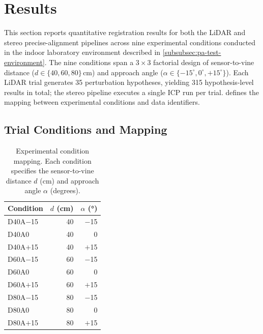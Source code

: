 \section{Results}
\label{sec:precise-alignment-results}

This section reports quantitative registration results for both the LiDAR and stereo precise-alignment pipelines across nine experimental conditions conducted in the indoor laboratory environment described in \cref{subsubsec:pa-test-environment}. The nine conditions span a $3 \times 3$ factorial design of sensor-to-vine distance ($d \in \{40, 60, 80\}$\,cm) and approach angle ($\alpha \in \{-15^{\circ}, 0^{\circ}, +15^{\circ}\}$). Each LiDAR trial generates 35 perturbation hypotheses, yielding 315 hypothesis-level results in total; the stereo pipeline executes a single ICP run per trial.  defines the mapping between experimental conditions and data identifiers.

\subsection{Trial Conditions and Mapping}
\label{subsec:pa-results-condition-map}

\begin{table}[htbp]
  \centering
  \caption{Experimental condition mapping. Each condition specifies the sensor-to-vine distance $d$ (cm) and approach angle $\alpha$ (degrees).}
  \label{tab:pa-results-condition-map}
  \begin{tabular}{@{} l r r @{}}
    \toprule
    \textbf{Condition} & \boldmath$d$ \textbf{(cm)} & \boldmath$\alpha$ \textbf{(°)} \\
    \midrule
    D40A$-$15 &  40 & $-$15 \\
    D40A0     &  40 &     0 \\
    D40A$+$15 &  40 & $+$15 \\
    D60A$-$15 &  60 & $-$15 \\
    D60A0     &  60 &     0 \\
    D60A$+$15 &  60 & $+$15 \\
    D80A$-$15 &  80 & $-$15 \\
    D80A0     &  80 &     0 \\
    D80A$+$15 &  80 & $+$15 \\
    \bottomrule
  \end{tabular}
\end{table}

